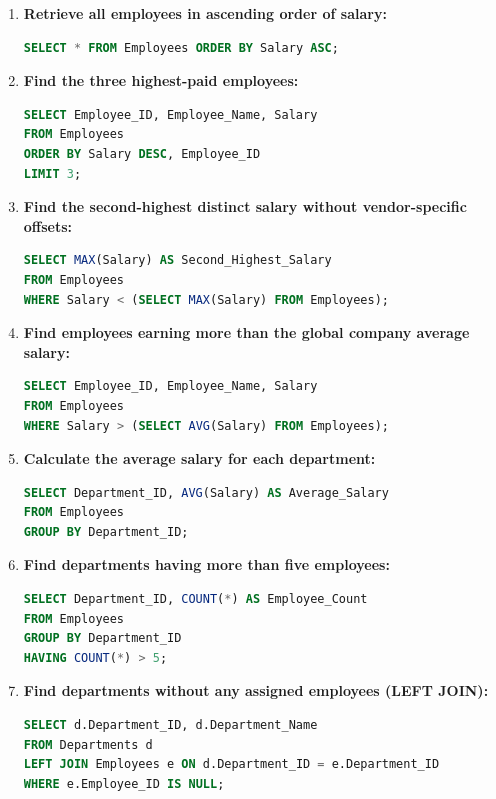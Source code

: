 \begin{enumerate}[label=\textbf{Q\arabic*.},leftmargin=1.2cm]
\item \textbf{Retrieve all employees in ascending order of salary:}
\begin{lstlisting}[language=SQL]
SELECT * FROM Employees ORDER BY Salary ASC;
\end{lstlisting}

\item \textbf{Find the three highest-paid employees:}
\begin{lstlisting}[language=SQL]
SELECT Employee_ID, Employee_Name, Salary 
FROM Employees 
ORDER BY Salary DESC, Employee_ID 
LIMIT 3;
\end{lstlisting}

\item \textbf{Find the second-highest distinct salary without vendor-specific offsets:}
\begin{lstlisting}[language=SQL]
SELECT MAX(Salary) AS Second_Highest_Salary 
FROM Employees 
WHERE Salary < (SELECT MAX(Salary) FROM Employees);
\end{lstlisting}

\item \textbf{Find employees earning more than the global company average salary:}
\begin{lstlisting}[language=SQL]
SELECT Employee_ID, Employee_Name, Salary 
FROM Employees 
WHERE Salary > (SELECT AVG(Salary) FROM Employees);
\end{lstlisting}

\item \textbf{Calculate the average salary for each department:}
\begin{lstlisting}[language=SQL]
SELECT Department_ID, AVG(Salary) AS Average_Salary 
FROM Employees 
GROUP BY Department_ID;
\end{lstlisting}

\item \textbf{Find departments having more than five employees:}
\begin{lstlisting}[language=SQL]
SELECT Department_ID, COUNT(*) AS Employee_Count 
FROM Employees 
GROUP BY Department_ID 
HAVING COUNT(*) > 5;
\end{lstlisting}

\item \textbf{Find departments without any assigned employees (LEFT JOIN):}
\begin{lstlisting}[language=SQL]
SELECT d.Department_ID, d.Department_Name 
FROM Departments d 
LEFT JOIN Employees e ON d.Department_ID = e.Department_ID 
WHERE e.Employee_ID IS NULL;
\end{lstlisting}


\end{enumerate}
